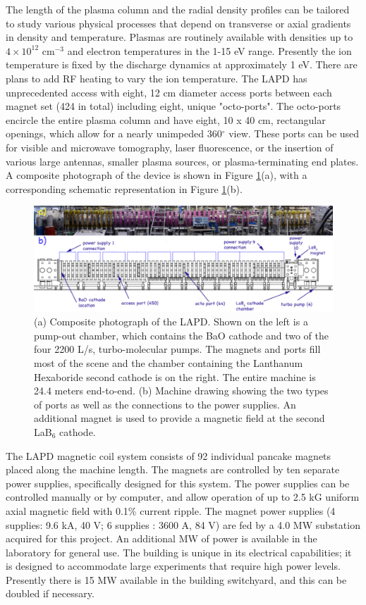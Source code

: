 \documentclass[11pt]{article}
\begin{document}
	The length of the plasma column and the radial density profiles can be tailored to study various physical processes that depend on transverse or axial gradients in density and temperature.  Plasmas are routinely available with densities up to $4\times 10^{12}$ cm$^{-3}$ and electron temperatures in the 1-15 eV range. Presently the ion temperature is fixed by the discharge dynamics at approximately 1 eV.  There are plans to add RF heating to vary the ion temperature.
 	The LAPD has unprecedented access with eight, 12 cm diameter access ports between each magnet set (424 in total) including eight, unique "octo-ports".  The octo-ports encircle the entire plasma column and have eight, 10 x 40 cm, rectangular openings, which allow for a nearly unimpeded 360$^{\circ}$ view.  These ports can be used for visible and microwave tomography, laser fluorescence, or the insertion of various large antennas, smaller plasma sources, or plasma-terminating end plates.  A composite photograph of the device is shown in Figure \ref{fig:LAPD}(a), with a corresponding schematic representation in Figure \ref{fig:LAPD}(b).
	\begin{figure}[htbp] %
	   \centering
	   \includegraphics[width=6.5in]{LAPD.jpg} 
	   \caption{(a) Composite photograph of the LAPD.  Shown on the left is a pump-out chamber, which contains the BaO cathode and two of the four 2200 L/s, turbo-molecular pumps. The magnets and ports fill most of the scene and the chamber containing the Lanthanum Hexaboride second cathode is on the right.  The entire machine is 24.4 meters end-to-end. (b) Machine drawing showing the two types of ports as well as the connections to the power supplies. An additional magnet is used to provide a magnetic field at the second LaB$_{6}$ cathode. }
	   \label{fig:LAPD}
	\end{figure}
	
	The LAPD magnetic coil system consists of 92 individual pancake magnets placed along the machine length. The magnets are controlled by ten separate power supplies, specifically designed for this system.  The power supplies can be controlled manually or by computer, and allow operation of up to 2.5 kG uniform axial magnetic field with 0.1\% current ripple.  The magnet power supplies (4 supplies: 9.6 kA, 40 V; 6 supplies : 3600 A, 84 V) are fed by a 4.0 MW substation acquired for this project.  An additional MW of power is available in the laboratory for general use.  The building is unique in its electrical capabilities; it is designed to accommodate large experiments that require high power levels.  Presently there is 15 MW available in the building switchyard, and this can be doubled if necessary.
	
\end{document}
